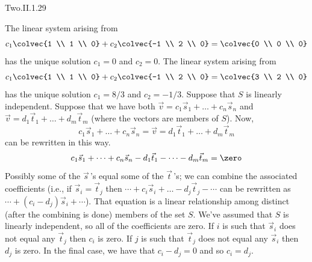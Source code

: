 \begin{ans}{Two.II.1.29}
      \begin{exparts}
        \partsitem The linear system arising from
          \begin{equation*}
            c_1\colvec{1 \\ 1 \\ 0}
            +c_2\colvec{-1 \\ 2 \\ 0}
            =\colvec{0 \\ 0 \\ 0}
          \end{equation*}
          has the unique solution \( c_1=0 \) and \( c_2=0 \).
        \partsitem The linear system arising from
          \begin{equation*}
            c_1\colvec{1 \\ 1 \\ 0}
            +c_2\colvec{-1 \\ 2 \\ 0}
            =\colvec{3 \\ 2 \\ 0}
          \end{equation*}
          has the unique solution \( c_1=8/3 \) and \( c_2=-1/3 \).
        \partsitem Suppose that \( S \) is linearly independent.
          Suppose that we have both $\vec{v}=c_1\vec{s}_1+\dots+c_n\vec{s}_n$
          and $\vec{v}=d_1\vec{t}_1+\dots+d_m\vec{t}_m$
          (where the vectors are members of $S$).
          Now,
          \begin{equation*}
            c_1\vec{s}_1+\dots+c_n\vec{s}_n
            =\vec{v}
            =d_1\vec{t}_1+\dots+d_m\vec{t}_m
          \end{equation*}
          can be rewritten in this way.
          \begin{equation*}
            c_1\vec{s}_1+\dots+c_n\vec{s}_n
            -d_1\vec{t}_1-\dots-d_m\vec{t}_m
            =\zero
          \end{equation*}
          Possibly some of the $\vec{s}\,$'s equal some of the $\vec{t}\,$'s;
          we can combine the associated coefficients
          (i.e., if $\vec{s}_i=\vec{t}_j$ then
          $\cdots+c_i\vec{s}_i+\dots-d_j\vec{t}_j-\cdots$ can be rewritten
          as $\cdots+(c_i-d_j)\vec{s}_i+\cdots$).
          That equation is a linear relationship among
          distinct (after the combining is done) members of the set $S$.
          We've assumed that $S$ is linearly independent, so all of the
          coefficients are zero.
          If $i$ is such that $\vec{s}_i$ does not equal any $\vec{t}_j$
          then $c_i$ is zero.
          If $j$ is such that $\vec{t}_j$ does not equal any $\vec{s}_i$
          then $d_j$ is zero.
          In the final case, we have that $c_i-d_j=0$ and so $c_i=d_j$.


\end{exparts}
\end{ans}
